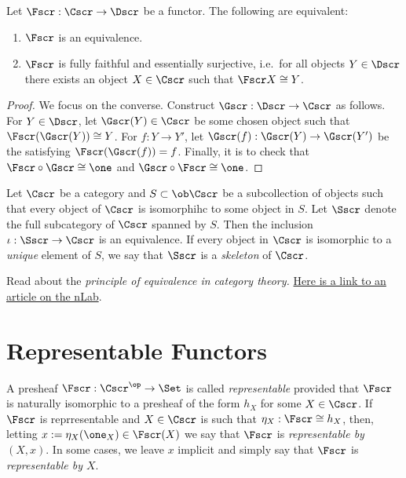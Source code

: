 \begin{theorem}
  Let $\Fscr : \Cscr \to \Dscr$ be a functor.
  The following are equivalent:
  \begin{enumerate}
    \item $\Fscr$ is an equivalence.
    \item $\Fscr$ is fully faithful and essentially surjective, i.e.~for all objects $Y \in \Dscr$ there exists an object $X \in \Cscr$ such that $\Fscr X \cong Y$.
  \end{enumerate}
\end{theorem}
\begin{proof}
  We focus on the converse.
  Construct $\Gscr : \Dscr \to \Cscr$ as follows.
  For $Y \in \Dscr$, let $\Gscr(Y) \in \Cscr$ be some chosen object such that $\Fscr(\Gscr(Y)) \cong Y$.
  For $f : Y \to Y'$, let $\Gscr(f) : \Gscr(Y) \to \Gscr(Y')$ be the  satisfying $\Fscr(\Gscr(f)) = f$.
  Finally, it is  to check that $\Fscr \circ \Gscr \cong \one$ and $\Gscr \circ \Fscr \cong \one$.
\end{proof}

\begin{example}
  Let $\Cscr$ be a category and $S \subset \ob \Cscr$ be a subcollection of objects such that every object of $\Cscr$ is isomorphihc to some object in $S$.
  Let $\Sscr$ denote the full subcategory of $\Cscr$ spanned by $S$.
  Then the inclusion $\iota : \Sscr \to \Cscr$ is an equivalence.
  If every object in $\Cscr$ is isomorphic to a \emph{unique} element of $S$, we say that $\Sscr$ is a \emph{skeleton} of $\Cscr$.
\end{example}

\begin{exercise}
  Read about the \emph{principle of equivalence in category theory.}
  \href{https://ncatlab.org/nlab/show/principle+of+equivalence}{Here is a link to an article on the nLab}.
\end{exercise}

\section{Representable Functors}

A presheaf $\Fscr : \Cscr^\op \to \Set$ is called \emph{representable} provided that $\Fscr$ is naturally isomorphic to a presheaf of the form $h_{X}$ for some $X \in \Cscr$.
If $\Fscr$ is reprresentable and $X \in \Cscr$ is such that $\eta_{X} : \Fscr \cong h_{X}$, then, letting $x := \eta_{X}(\one_{X}) \in \Fscr(X)$ we say that $\Fscr$ is \emph{representable by $(X,x)$}.
In some cases, we leave $x$ implicit and simply say that $\Fscr$ is \emph{representable by $X$}.

